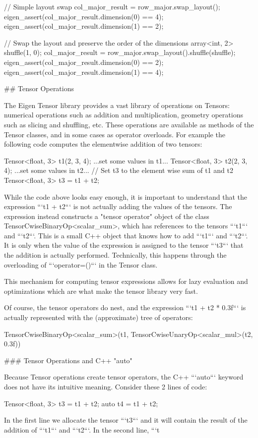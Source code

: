 \begin{DoxyCode}
    // Simple layout swap
    col\_major\_result = row\_major.swap\_layout();
    eigen\_assert(col\_major\_result.dimension(0) == 4);
    eigen\_assert(col\_major\_result.dimension(1) == 2);

    // Swap the layout and preserve the order of the dimensions
    array<int, 2> shuffle(1, 0);
    col\_major\_result = row\_major.swap\_layout().shuffle(shuffle);
    eigen\_assert(col\_major\_result.dimension(0) == 2);
    eigen\_assert(col\_major\_result.dimension(1) == 4);


## Tensor Operations

The Eigen Tensor library provides a vast library of operations on Tensors:
numerical operations such as addition and multiplication, geometry operations
such as slicing and shuffling, etc.  These operations are available as methods
of the Tensor classes, and in some cases as operator overloads.  For example
the following code computes the elementwise addition of two tensors:

    Tensor<float, 3> t1(2, 3, 4);
    ...set some values in t1...
    Tensor<float, 3> t2(2, 3, 4);
    ...set some values in t2...
    // Set t3 to the element wise sum of t1 and t2
    Tensor<float, 3> t3 = t1 + t2;

While the code above looks easy enough, it is important to understand that the
expression ```t1 + t2``` is not actually adding the values of the tensors.  The
expression instead constructs a "tensor operator" object of the class
TensorCwiseBinaryOp<scalar\_sum>, which has references to the tensors
```t1``` and ```t2```.  This is a small C++ object that knows how to add
```t1``` and ```t2```.  It is only when the value of the expression is assigned
to the tensor ```t3``` that the addition is actually performed.  Technically,
this happens through the overloading of ```operator=()``` in the Tensor class.

This mechanism for computing tensor expressions allows for lazy evaluation and
optimizations which are what make the tensor library very fast.

Of course, the tensor operators do nest, and the expression ```t1 + t2 *
0.3f``` is actually represented with the (approximate) tree of operators:

    TensorCwiseBinaryOp<scalar\_sum>(t1, TensorCwiseUnaryOp<scalar\_mul>(t2, 0.3f))


### Tensor Operations and C++ "auto"

Because Tensor operations create tensor operators, the C++ ```auto``` keyword
does not have its intuitive meaning.  Consider these 2 lines of code:

    Tensor<float, 3> t3 = t1 + t2;
    auto t4 = t1 + t2;

In the first line we allocate the tensor ```t3``` and it will contain the
result of the addition of ```t1``` and ```t2```.  In the second line, ```t
\end{DoxyCode}

